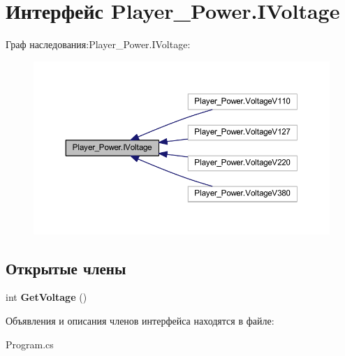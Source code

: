 \section{Интерфейс Player\-\_\-\-Power.\-I\-Voltage}
\label{interface_player___power_1_1_i_voltage}


Граф наследования\-:Player\-\_\-\-Power.\-I\-Voltage\-:
\nopagebreak
\begin{figure}[H]
\begin{center}
\leavevmode
\includegraphics[width=350pt]{interface_player___power_1_1_i_voltage__inherit__graph}
\end{center}
\end{figure}
\subsection*{Открытые члены}
\begin{DoxyCompactItemize}
\item 
int {\bfseries Get\-Voltage} ()\label{interface_player___power_1_1_i_voltage_a3be8758f9d6d9ae3ce0d8344bcc39ee1}

\end{DoxyCompactItemize}


Объявления и описания членов интерфейса находятся в файле\-:\begin{DoxyCompactItemize}
\item 
Program.\-cs\end{DoxyCompactItemize}
